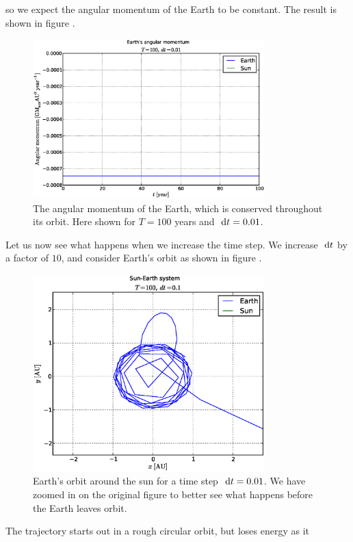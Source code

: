 so we expect the angular momentum of the Earth to be constant. The result is
shown in figure .
%
\begin{figure}[htpb]
	\centering
	\includegraphics[width=0.8\textwidth]{figures/earth_angmom_dt1e-2}
	\caption{The angular momentum of the Earth, which is conserved throughout
	its orbit. Here shown for $T = 100$ years and $\ \mathrm{d}t = 0.01$.}
	\label{fig:angmom}
\end{figure}
%
Let us now see what happens when we increase the time step. We increase
$\ \mathrm{d}t$ by a factor of $10$, and consider Earth's orbit as shown in figure
.
%
\begin{figure}[htpb]
	\centering
	\includegraphics[width=0.8\textwidth]{figures/sun_earth_T100_dt1e-1_zoom}
	\caption{Earth's orbit around the sun for a time step $\ \mathrm{d}t = 0.01$. We have
	zoomed in on the original figure to better see what happens before the Earth
	leaves orbit.}
	\label{fig:sunEarth-dt0.1}
\end{figure}
%
The trajectory starts out in a rough circular orbit, but loses energy as it
